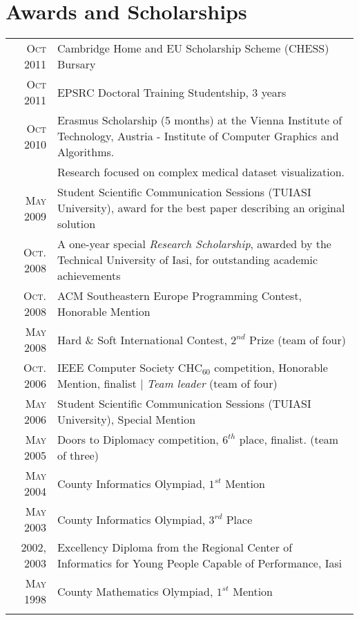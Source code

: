 \documentclass[a4paper,11pt]{article}
\begin{document}
\section{Awards and Scholarships}
\begin{longtable}{rp{11cm}}
\textsc{Oct} 2011 & Cambridge Home and EU Scholarship Scheme (CHESS) Bursary\smallskip\\
\textsc{Oct} 2011 & EPSRC Doctoral Training Studentship, 3 years\smallskip\\
\textsc{Oct} 2010 & Erasmus Scholarship (5 months) at the Vienna Institute of Technology, Austria - Institute of Computer Graphics and Algorithms.\\
&Research focused on complex medical dataset visualization.\smallskip\\
\textsc{May} 2009 & Student Scientific Communication Sessions (TUIASI University), award for the best paper describing an original solution\smallskip\\
\textsc{Oct.} 2008 & A one-year special \emph{Research Scholarship}, awarded by the Technical University of Iasi, for outstanding academic achievements\smallskip\\
\textsc{Oct.} 2008 & ACM Southeastern Europe Programming Contest, Honorable Mention\smallskip\\
\textsc{May} 2008 & Hard \& Soft International Contest, $2^{nd}$ Prize (team of four)\smallskip\\
\textsc{Oct.} 2006 & IEEE Computer Society CHC$_{60}$ competition, Honorable Mention, finalist | \emph{Team leader} (team of four)\smallskip\\
\textsc{May} 2006 & Student Scientific Communication Sessions (TUIASI University), Special Mention\smallskip\\
\textsc{May} 2005 & Doors to Diplomacy competition, $6^{th}$ place, finalist. (team of three)\smallskip\\
\textsc{May} 2004 & County Informatics Olympiad, $1^{st}$ Mention\smallskip\\
\textsc{May} 2003 & County Informatics Olympiad, $3^{rd}$ Place\smallskip\\
2002, 2003 & Excellency Diploma from the Regional Center of Informatics for Young People Capable of Performance, Iasi\smallskip\\
\textsc{May} 1998 & County Mathematics Olympiad, $1^{st}$ Mention\\\multicolumn{2}{c}{} \\
\end{longtable}
\end{document}
